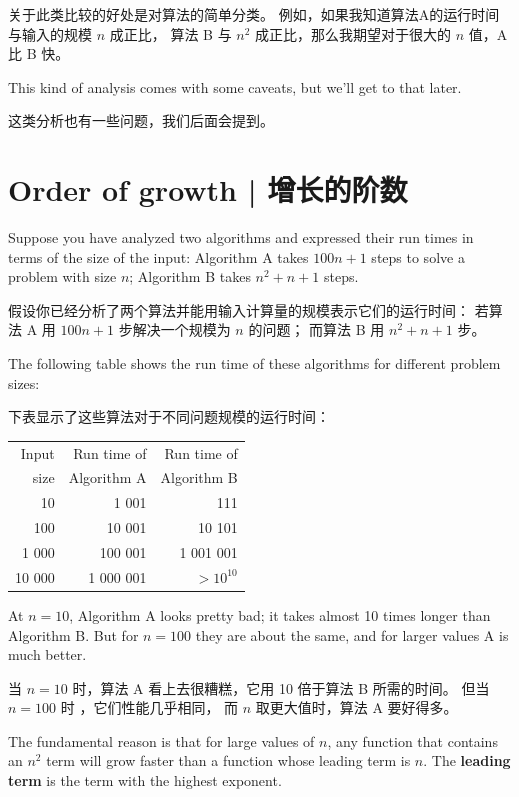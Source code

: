 关于此类比较的好处是对算法的简单分类。
例如，如果我知道算法A的运行时间与输入的规模 $n$ 成正比，
算法 B 与 $n^2$ 成正比，那么我期望对于很大的 $n$ 值，A 比 B 快。

This kind of analysis comes with some caveats, but we'll get
to that later.

这类分析也有一些问题，我们后面会提到。


\section{Order of growth  |  增长的阶数}

Suppose you have analyzed two algorithms and expressed
their run times in terms of the size of the input:
Algorithm A takes $100n+1$ steps to solve a problem with
size $n$; Algorithm B takes $n^2 + n + 1$ steps.

假设你已经分析了两个算法并能用输入计算量的规模表示它们的运行时间：
若算法 A 用 $100n+1$ 步解决一个规模为 $n$ 的问题；
而算法 B 用 $n^2 + n + 1$ 步。
  

The following table shows the run time of these algorithms
for different problem sizes:

下表显示了这些算法对于不同问题规模的运行时间：

\begin{tabular}{|r|r|r|}
\hline
Input     &   Run time of     & Run time of \\
size      &   Algorithm A     & Algorithm B \\
\hline
10        &   1 001           & 111         \\
100       &   10 001          & 10 101         \\
1 000     &   100 001         & 1 001 001         \\
10 000    &   1 000 001       & $> 10^{10}$         \\
\hline
\end{tabular}

At $n=10$, Algorithm A looks pretty bad; it takes almost 10 times
longer than Algorithm B.  But for $n=100$ they are about the same, and
for larger values A is much better.

当 $n=10$ 时，算法 A 看上去很糟糕，它用 10 倍于算法 B 所需的时间。
但当 $n=100$ 时 ，它们性能几乎相同， 而 $n$ 取更大值时，算法 A 要好得多。

The fundamental reason is that for large values of $n$, any function
that contains an $n^2$ term will grow faster than a function whose
leading term is $n$.  The {\bf leading term} is the term with the
highest exponent.

